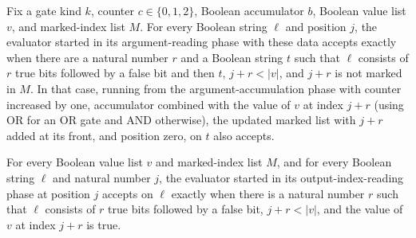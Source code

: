 \begin{theorem}
\label{BoolCircuit.CircuitEval.absRun_u}
\leanok
{}
Fix a gate kind $k$, counter $c\in\{0,1,2\}$, Boolean accumulator $b$, Boolean value
list $v$, and marked-index list $M$. For every Boolean string $\ell$ and position $j$,
the evaluator started in its argument-reading phase with these data accepts exactly when
there are a natural number $r$ and a Boolean string $t$ such that $\ell$ consists of $r$
true bits followed by a false bit and then $t$, $j+r<|v|$, and $j+r$ is not marked in
$M$. In that case, running from the argument-accumulation phase with counter increased
by one, accumulator combined with the value of $v$ at index $j+r$ (using OR for an OR
gate and AND otherwise), the updated marked list with $j+r$ added at its front, and
position zero, on $t$ also accepts.
\end{theorem}

\begin{theorem}
\label{BoolCircuit.CircuitEval.absRun_o}
\leanok
{}
For every Boolean value list $v$ and marked-index list $M$, and for every Boolean string
$\ell$ and natural number $j$, the evaluator started in its output-index-reading phase
at position $j$ accepts on $\ell$ exactly when there is a natural number $r$ such that
$\ell$ consists of $r$ true bits followed by a false bit, $j+r<|v|$, and the value of
$v$ at index $j+r$ is true.
\end{theorem}

